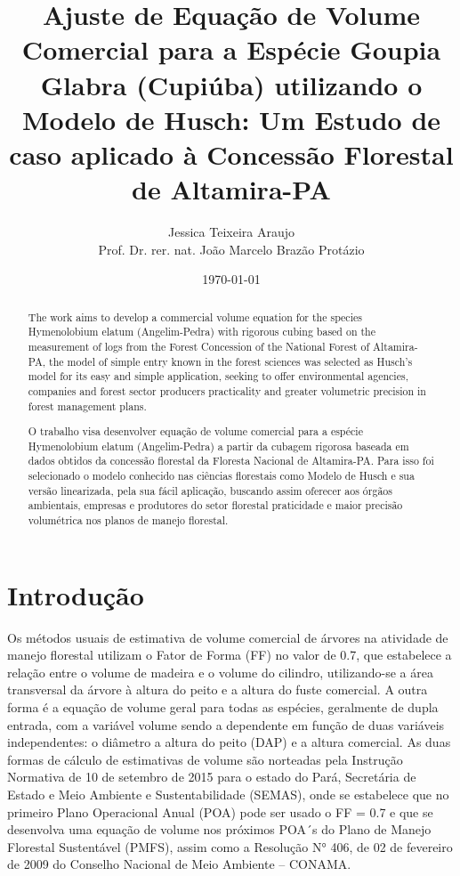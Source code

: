 \documentclass[a4paper,12pt]{article}
\title{Ajuste de Equação de Volume Comercial para a Espécie Goupia Glabra (Cupiúba) utilizando o Modelo de Husch: Um Estudo de caso aplicado à Concessão Florestal de Altamira-PA} %
\author{Jessica Teixeira Araujo \\ Prof. Dr. rer. nat. João Marcelo Brazão Protázio}
\date{\today} %
\begin{document}
	
\maketitle

\begin{abstract}
\noindent
The work aims to develop a commercial volume equation for the species Hymenolobium elatum (Angelim-Pedra) with rigorous cubing based on the measurement of logs from the Forest Concession of the National Forest of Altamira-PA, the model of simple entry known in the forest sciences was selected as Husch's model for its easy and simple application, seeking to offer environmental agencies, companies and forest sector producers practicality and greater volumetric precision in forest management plans.
\end{abstract} %

\begin{abstract}
\noindent
O trabalho visa desenvolver equação de volume comercial para a espécie Hymenolobium elatum (Angelim-Pedra) a partir da cubagem rigorosa baseada em dados obtidos da concessão florestal da Floresta Nacional de Altamira-PA. Para isso foi selecionado o modelo conhecido nas ciências florestais como Modelo de Husch e sua versão linearizada, pela sua fácil aplicação, buscando assim oferecer aos órgãos ambientais, empresas e produtores do setor florestal praticidade e maior precisão volumétrica nos planos de manejo florestal.
\end{abstract} %

\section{Introdução}

Os métodos usuais de estimativa de volume comercial de árvores na atividade de manejo florestal utilizam o Fator de Forma (FF) no valor de 0.7, que estabelece a relação entre o volume de madeira e o volume do cilindro, utilizando-se a área transversal da árvore à altura do peito e a altura do fuste comercial. A outra forma é a equação de volume geral para todas as espécies, geralmente de dupla entrada, com a variável volume sendo a dependente em função de duas variáveis independentes: o diâmetro a altura do peito (DAP) e a altura comercial. As duas formas de cálculo de estimativas de volume são norteadas pela Instrução Normativa de 10 de setembro de 2015 para o estado do Pará, Secretária de Estado e Meio Ambiente e Sustentabilidade (SEMAS), onde se estabelece que no primeiro Plano Operacional Anual (POA) pode ser usado o FF = 0.7 e que se desenvolva uma equação de volume nos próximos POA´s do Plano de Manejo Florestal Sustentável (PMFS), assim como a Resolução N° 406, de 02 de fevereiro de 2009 do Conselho Nacional de Meio Ambiente – CONAMA.
\end{document}

